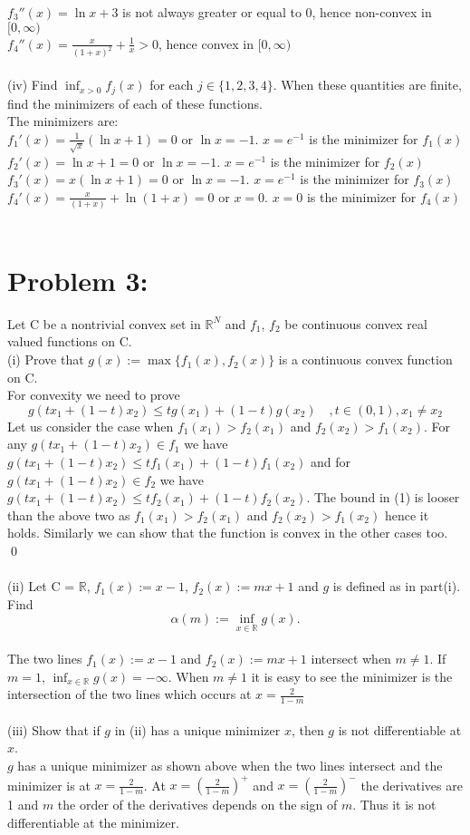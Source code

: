 \documentclass[12pt]{report}
\begin{document}
$ f_3''(x) = \ln x + 3 $ is not always greater or equal to 0, hence non-convex in $[0, \infty)$\\
$ f_4''(x) = \frac{x}{(1 + x)^2} + \frac{1}{x}>0 $, hence convex in $[0, \infty)$\\
\\
(iv) Find $\inf_{x>0} f_j (x)$ for each $j \in \{1, 2, 3, 4\}$. When these quantities are
finite, find the minimizers of each of these functions.\\
The minimizers are:\\
$ f_1'(x) = \frac{1}{\sqrt{x}} (\ln x+1) = 0$ or $\ln x=-1$. $x=e^{-1}$ is the minimizer for
$ f_1(x)$\\
$ f_2'(x) = \ln x+1 = 0$ or $\ln x=-1$. $x=e^{-1}$ is the minimizer for $ f_2(x)$\\
$ f_3'(x) = x(\ln x + 1) = 0 $ or $\ln x=-1$.  $x=e^{-1}$ is the minimizer for $ f_3(x)$\\
$ f_4'(x) = \frac{x}{(1 + x)} + \ln(1 + x) = 0$ or $x=0$. $x=0$ is the minimizer for $ f_4(x)$\\
\\
\section*{Problem 3:}
Let C be a nontrivial convex set in $\mathbb{R}^N$ and $f_1$, $f_2$ be continuous convex real
valued functions on C.\\
(i) Prove that $g(x):=\max\{f_1(x), f_2(x)\}$ is a continuous convex function on C.\\
For convexity we need to prove
\begin{equation}
g(tx_1+(1-t)x_2)\leq t g(x_1)+(1-t)g(x_2) \quad ,t\in(0,1), x_1\neq x_2
\end{equation}
Let us consider the case when $f_1(x_1) >f_2(x_1)$ and $f_2(x_2) >f_1(x_2)$. For any
$g(tx_1+(1-t)x_2)\in f_1$ we have $g(tx_1+(1-t)x_2)\leq t f_1(x_1)+(1-t)f_1(x_2)$ and for \\
$g(tx_1+(1-t)x_2)\in f_2$ we have $g(tx_1+(1-t)x_2)\leq t f_2(x_1)+(1-t)f_2(x_2)$. The bound in
(1) is looser than the above two as $f_1(x_1) >f_2(x_1)$ and $f_2(x_2) >f_1(x_2)$ hence it holds.
Similarly we can show that the function is convex in the other cases too. \qed
\\
\\
(ii) Let C = $\mathbb{R}$, $f_1(x):=x-1$, $f_2(x):=mx+1$ and $g$ is defined as in part(i). Find
$$\alpha(m):=\inf_{x\in \mathbb{R}}g(x).$$\\
The two lines $f_1(x):=x-1$ and $f_2(x):=mx+1$ intersect when $m\neq1$. If
$m=1$, $\inf_{x\in \mathbb{R}}g(x)=-\infty$. When $m\neq1$ it is easy to see the minimizer is the
intersection of the two lines which occurs at $x=\frac{2}{1-m}$ \\
\\
(iii) Show that if $g$ in (ii) has a unique minimizer $x$, then $g$ is not differentiable at
$x$.\\
$g$ has a unique minimizer as shown above when the two lines intersect and the minimizer is at
$x=\frac{2}{1-m}$. At $x=\left(\frac{2}{1-m}\right)^+$ and $x=\left(\frac{2}{1-m}\right)^-$ the
derivatives are 1 and $m$ the order of the derivatives depends on the sign of $m$. Thus it is not
differentiable at the minimizer.
\end{document}
